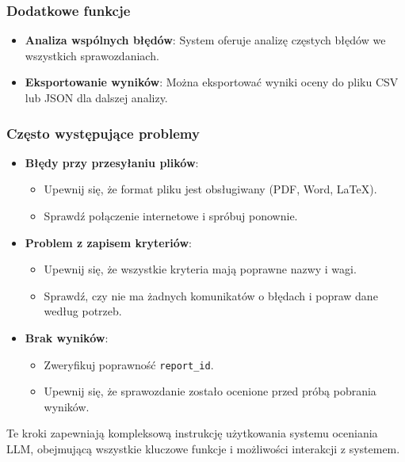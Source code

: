 \documentclass[a4paper, 12pt]{article}
\begin{document}
\subsubsection*{Dodatkowe funkcje}

\begin{itemize}
    \item \textbf{Analiza wspólnych błędów}: System oferuje analizę częstych błędów we wszystkich sprawozdaniach.
    \item \textbf{Eksportowanie wyników}: Można eksportować wyniki oceny do pliku CSV lub JSON dla dalszej analizy.
\end{itemize}

\subsubsection*{Często występujące problemy}

\begin{itemize}
    \item \textbf{Błędy przy przesyłaniu plików}:
    \begin{itemize}
        \item Upewnij się, że format pliku jest obsługiwany (PDF, Word, LaTeX).
        \item Sprawdź połączenie internetowe i spróbuj ponownie.
    \end{itemize}
    \item \textbf{Problem z zapisem kryteriów}:
    \begin{itemize}
        \item Upewnij się, że wszystkie kryteria mają poprawne nazwy i wagi.
        \item Sprawdź, czy nie ma żadnych komunikatów o błędach i popraw dane według potrzeb.
    \end{itemize}
    \item \textbf{Brak wyników}:
    \begin{itemize}
        \item Zweryfikuj poprawność \texttt{report\_id}.
        \item Upewnij się, że sprawozdanie zostało ocenione przed próbą pobrania wyników.
    \end{itemize}
\end{itemize}

Te kroki zapewniają kompleksową instrukcję użytkowania systemu oceniania LLM, obejmującą wszystkie kluczowe funkcje i możliwości interakcji z systemem.


\newpage
\end{document}
